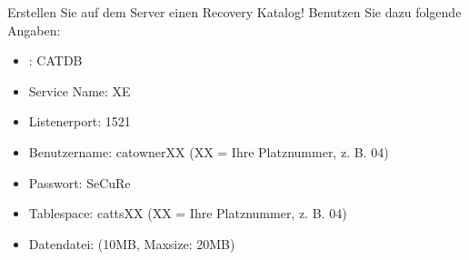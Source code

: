     \item Erstellen Sie auf dem Server  einen Recovery Katalog! Benutzen Sie dazu folgende Angaben:
      \begin{itemize}
        \item {}: CATDB
        \item Service Name: XE
        \item Listenerport: 1521
        \item Benutzername: catownerXX (XX = Ihre Platznummer, z. B. 04)
        \item Passwort: SeCuRe
        \item Tablespace: cattsXX (XX = Ihre Platznummer, z. B. 04)
        \item Datendatei:  (10MB, Maxsize: 20MB)
      \end{itemize}
